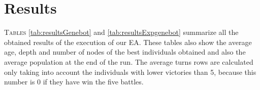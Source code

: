 \section{Results}

\lettrine{T}{ables} \ref{tab:resultsGenebot} and \ref{tab:resultsExpgenebot} summarize all the obtained results of the execution of our EA. These tables also show the average age, depth and number of nodes of the best individuals obtained and also the average population at the end of the run. The average turns rows are calculated only taking into account the individuals with lower victories than 5, because this number is 0 if they have win the five battles.

\newcommand{\SetRowColor}[1]{\noalign{\gdef\RowColorName{#1}}\rowcolor{\RowColorName}}
\newcommand{\mymulticolumn}[3]{\multicolumn{#1}{>{\columncolor{\RowColorName}}#2}{#3}}
\newcommand{\mymultirow}[3]{\multirow{#1}{>{\rowcolor{\RowColorName}}#2}{#3}}


